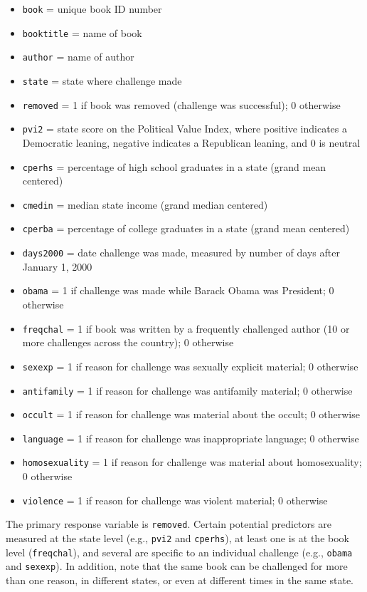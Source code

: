 \documentclass[
]{krantz}
\providecommand{\tightlist}{%
  \setlength{\itemsep}{0pt}\setlength{\parskip}{0pt}}
\begin{document}
\begin{enumerate}
  \begin{itemize}
  \tightlist
  \item
    \texttt{book} = unique book ID number
  \item
    \texttt{booktitle} = name of book
  \item
    \texttt{author} = name of author
  \item
    \texttt{state} = state where challenge made
  \item
    \texttt{removed} = 1 if book was removed (challenge was successful); 0 otherwise
  \item
    \texttt{pvi2} = state score on the Political Value Index, where positive indicates a Democratic leaning, negative indicates a Republican leaning, and 0 is neutral
  \item
    \texttt{cperhs} = percentage of high school graduates in a state (grand mean centered)
  \item
    \texttt{cmedin} = median state income (grand median centered)
  \item
    \texttt{cperba} = percentage of college graduates in a state (grand mean centered)
  \item
    \texttt{days2000} = date challenge was made, measured by number of days after January 1, 2000
  \item
    \texttt{obama} = 1 if challenge was made while Barack Obama was President; 0 otherwise
  \item
    \texttt{freqchal} = 1 if book was written by a frequently challenged author (10 or more challenges across the country); 0 otherwise
  \item
    \texttt{sexexp} = 1 if reason for challenge was sexually explicit material; 0 otherwise
  \item
    \texttt{antifamily} = 1 if reason for challenge was antifamily material; 0 otherwise
  \item
    \texttt{occult} = 1 if reason for challenge was material about the occult; 0 otherwise
  \item
    \texttt{language} = 1 if reason for challenge was inappropriate language; 0 otherwise
  \item
    \texttt{homosexuality} = 1 if reason for challenge was material about homosexuality; 0 otherwise
  \item
    \texttt{violence} = 1 if reason for challenge was violent material; 0 otherwise
  \end{itemize}

  The primary response variable is \texttt{removed}. Certain potential predictors are measured at the state level (e.g., \texttt{pvi2} and \texttt{cperhs}), at least one is at the book level (\texttt{freqchal}), and several are specific to an individual challenge (e.g., \texttt{obama} and \texttt{sexexp}). In addition, note that the same book can be challenged for more than one reason, in different states, or even at different times in the same state.


\end{enumerate}
\end{document}
